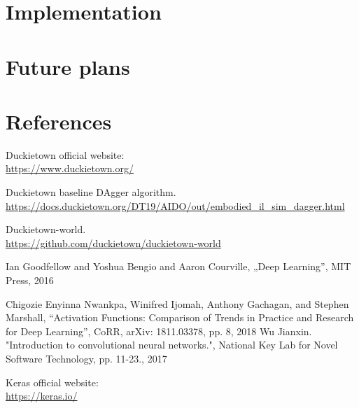 \documentclass{article}
\begin{document}

\section*{Implementation}

\vspace*{2\baselineskip}


\section*{Future plans}
\pagebreak


\section*{References}
\vspace*{1\baselineskip}

Duckietown official website:
\\
\url{https://www.duckietown.org/}
\vspace*{1\baselineskip}

Duckietown baseline DAgger algorithm.
\\
\url{https://docs.duckietown.org/DT19/AIDO/out/embodied_il_sim_dagger.html}
\vspace*{1\baselineskip}

Duckietown-world.
\\
\url{https://github.com/duckietown/duckietown-world}

\vspace*{1\baselineskip}

Ian Goodfellow and Yoshua Bengio and Aaron Courville, „Deep Learning”, MIT Press, 2016

\vspace*{1\baselineskip}
Chigozie Enyinna Nwankpa, Winifred Ijomah, Anthony Gachagan, and Stephen Marshall, “Activation Functions: Comparison of Trends in Practice and Research for Deep Learning”, CoRR, arXiv: 1811.03378, pp. 8, 2018
\vspace*{1\baselineskip}
Wu Jianxin. "Introduction to convolutional neural networks.", National Key Lab for Novel Software Technology, pp. 11-23., 2017
\vspace*{1\baselineskip}
\vspace*{1\baselineskip}

Keras official website:
\\
\url{https://keras.io/}
\vspace*{1\baselineskip}
\end{document}
